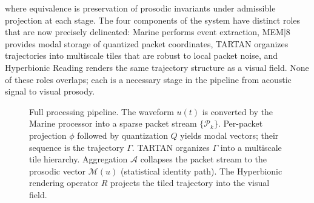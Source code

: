 \documentclass[12pt, a4paper]{article}
\begin{document}
where equivalence is preservation of prosodic invariants under admissible projection at each stage. The four components of the system have distinct roles that are now precisely delineated: Marine performs event extraction, MEM$|$8 provides modal storage of quantized packet coordinates, TARTAN organizes trajectories into multiscale tiles that are robust to local packet noise, and Hyperbionic Reading renders the same trajectory structure as a visual field. None of these roles overlaps; each is a necessary stage in the pipeline from acoustic signal to visual prosody.

\begin{figure}[p]
\centering
{}
\caption{Full processing pipeline. The waveform $u(t)$ is converted by the Marine processor into a sparse packet stream $\{\mathcal{P}_k\}$. Per-packet projection $\phi$ followed by quantization $Q$ yields modal vectors; their sequence is the trajectory $\Gamma$. TARTAN organizes $\Gamma$ into a multiscale tile hierarchy. Aggregation $\mathcal{A}$ collapses the packet stream to the prosodic vector $\mathcal{M}(u)$ (statistical identity path). The Hyperbionic rendering operator $R$ projects the tiled trajectory into the visual field.}
\label{fig:pipeline}
\end{figure}
\end{document}
